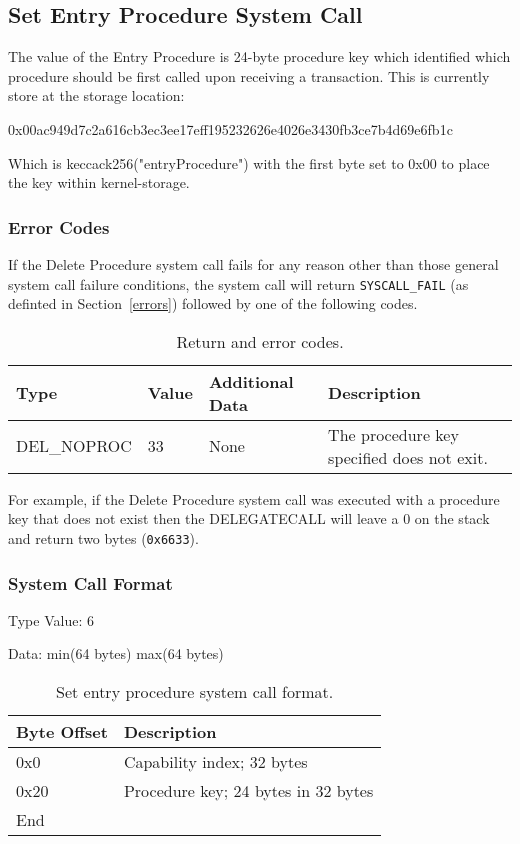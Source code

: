 \documentclass[english,a4paper]{article}
\let\oldparagraph\subsubsection
\renewcommand{\subsubsection}[1]{\oldparagraph{#1}\mbox{}}
\begin{document}
\subsection{Set Entry Procedure System Call}
The value of the Entry Procedure is 24-byte procedure key which identified which
procedure should be first called upon receiving a transaction. This is currently
store at the storage location:

0x00ac949d7c2a616cb3ec3ee17eff195232626e4026e3430fb3ce7b4d69e6fb1c

Which is keccack256("entryProcedure") with the first byte set to 0x00 to place
the key within kernel-storage.

\subsubsection{Error Codes}
If the Delete Procedure system call fails for any reason other than those
general system call failure conditions, the system call will return
\texttt{SYSCALL\_FAIL} (as definted in Section~\ref{errors}) followed by one of
the following codes.

\begin{table}[H]
  \caption{Return and error codes.}
  \centering{}%
  \begin{tabular}{l|l|p{}|p{}}
    \hline
    Type & Value & Additional Data & Description\tabularnewline
    \hline
    \hline
    DEL\_NOPROC  & 33 & None & The procedure key specified does not exit.
      \tabularnewline
    \hline
  \end{tabular}
\end{table}

For example, if the Delete
Procedure system call was executed with a procedure key that does not exist then
the DELEGATECALL will leave a 0 on the stack and return two bytes
(\texttt{0x6633}).

\subsubsection{System Call Format}

Type Value: 6

Data: min(64 bytes) max(64 bytes)

\begin{table}[H]
  \caption{Set entry procedure system call format.}
  \centering{}%
  \begin{tabular}{l|p{}}
    \hline
    Byte Offset & Description\tabularnewline
    \hline
    \hline
    0x0 & Capability index; 32 bytes \tabularnewline
    0x20 & Procedure key; 24 bytes in 32 bytes \tabularnewline
    \hline
    End &  \tabularnewline
    \hline
  \end{tabular}
\end{table}
\end{document}
